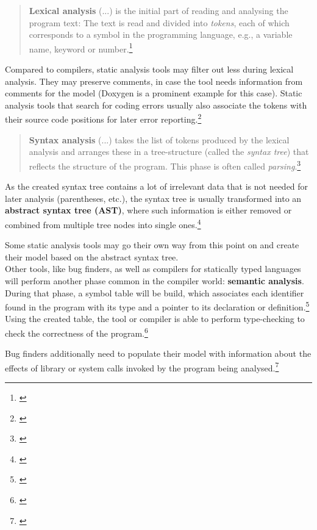 \begin{quotation}
\textbf{Lexical analysis} (...) is the initial part of reading and analysing the program text: The text is read and divided into \textit{tokens}, each of which corresponds to a symbol in the programming language, e.g., a variable name, keyword or number.\footnote{\citep[2]{CompilerBasics}}
\end{quotation}

Compared to compilers, static analysis tools may filter out less during lexical analysis. They may preserve comments, in case the tool needs information from comments for the model (Doxygen is a prominent example for this case).
Static analysis tools that search for coding errors usually also associate the tokens with their source code positions for later error reporting.\footnote{\citep[72]{SecureProgramming}} 

\begin{quotation}
\textbf{Syntax analysis} (...) takes the list of tokens produced by the lexical analysis and arranges these in a tree-structure (called the \textit{syntax tree}) that reflects the structure of the program. This phase is often called \textit{parsing}.\footnote{\citep[2]{CompilerBasics}}
\end{quotation}

As the created syntax tree contains a lot of irrelevant data that is not needed for later analysis (parentheses, etc.), the syntax tree is usually transformed into an \textbf{abstract syntax tree (AST)}, where such information is either removed or combined from multiple tree nodes into single ones.\footnote{\citep[99]{CompilerBasics}}

Some static analysis tools may go their own way from this point on and create their model based on the abstract syntax tree.\\Other tools, like bug finders, as well as compilers for statically typed languages will perform another phase common in the compiler world: \textbf{semantic analysis}. During that phase, a symbol table will be build, which associates each identifier found in the program with its type and a pointer to its declaration or definition.\footnote{\citep[76]{SecureProgramming}} Using the created table, the tool or compiler is able to perform type-checking to check the correctness of the program.\footnote{\citep[76]{SecureProgramming}}

Bug finders additionally need to populate their model with information about the effects of library or system calls invoked by the program being analysed.\footnote{\citep[37]{SecureProgramming}}

